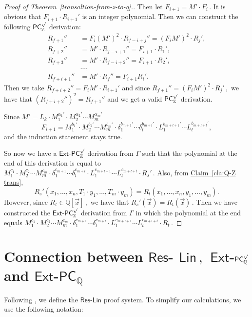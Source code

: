 \documentclass[11pt]{article}
\newcommand{\expref}[2]{\texorpdfstring{\hyperref[#2]{#1~\ref{#2}}}{#1~\ref{#2}}}
\newcommand{\Q}{{\mathbb Q}}
\newcommand{\Z}{{\mathbb Z}}
\begin{document}
\begin{proof}[Proof of \expref{Theorem}{transaltion-from-z-to-q}.]
%
Then let %
$F_{i + 1} = M' \cdot F_i\,.$ %
 It is obvious that $F_{i + 1} \cdot R_{i + 1}'$ is an integer polynomial. Then we can construct the following $\mathsf{PC}_{\Z}^{\surd}$ derivation: %
\begin{align*}
    R_{f + 1}'' &= F_i (M')^2 \cdot R_{f - i + j}'' =  (F_i M')^2 \cdot R_j', \\  R_{f + 2}'' &= M' \cdot R_{f - i + 1}'' = F_{i + 1} \cdot R_1', \\  R_{f + 3}'' &= M' \cdot R_{f - i + 2}'' = F_{i + 1} \cdot R_2', \\ &\ldots, \\ R_{f + i + 1}'' &= M' \cdot R_{f}'' = F_{i + 1} R_{i}'.
\end{align*}
Then we take $R_{f + i + 2}'' = F_i M' \cdot R_{i + 1}'$ and since %
$R_{f + 1}'' = (F_i M')^2 \cdot R_j'\,,$ %
 we have that $(R_{f + i + 2}'')^2 = R_{f + 1}''$ and we get a valid $\mathsf{PC}_{\Z}^{\surd}$ derivation.

%
Since  $M' = L_k \cdot M_1^{\alpha_1'} \cdot M_2^{\alpha_2'} \cdots M_m^{\alpha_m'}$ %
$$
%
F_{i + 1} = M_1^{b_1'} \cdot M_2^{b_2'} \cdots M_m^{b_m'} \cdot \delta_1^{b_{m + 1}'} \cdots \delta_l^{b_{m + l}'} \cdot  L_1^{b_{m + l + 1}'} \cdots L_t^{b_{m + l + t}'}, %
$$
and the induction statement stays true.




So now we have a $\mathsf{Ext}$-$\mathsf{PC}^{\surd}_{\Z}$ derivation from $\Gamma$ such that the polynomial at %
the end of this derivation is equal to %
$M_1^{c_1} \cdot M_2^{c_2} \cdots M_m^{c_m} \cdot \delta_1^{c_{m + 1}} \cdots \delta_l^{c_{m + l}} \cdot  L_1^{c_{m + l + 1}} \cdots L_t^{c_{m + l + t}}  \cdot R_s'\,.$ %
 Also, from  \expref{Claim}{cla:Q-Z trans},
$$
    R_s'(x_1, \ldots, x_n, T_1 \cdot y_1, \ldots, T_m \cdot y_m) = R_t(x_1, \ldots, x_n, y_1, \ldots, y_m).
$$
    However, since %
$R_t \in \Q[\vec x]\,,$ %
 we have that %
$R_s'(\vec x) = R_t(\vec x)\,.$ %
 Then we have constructed the $\mathsf{Ext}$-$\mathsf{PC}^{\surd}_{\Z}$ derivation from $\Gamma$ in which the polynomial at %
%
the end equals  %
$M_1^{c_1} \cdot M_2^{c_2} \cdots M_m^{c_m} \cdot \delta_1^{c_{m + 1}} \cdots \delta_l^{c_{m + l}} \cdot  L_1^{c_{m + l + 1}} \cdots L_t^{c_{m + l + t}}  \cdot R_t\,.$ %
%
\end{proof}


\section{Connection between \texorpdfstring{$\mathsf{Res}$-%
$\mathsf{Lin}\,,$ %
 $\mathsf{Ext}$-$\mathsf{PC}_{\Q}^{\surd}$ and $\mathsf{Ext}$-$\mathsf{PC}_{\Q}$}{Res-Lin, Ext-PC-Q-sqrt and Ext-PC-Q}}
\label{section-4}
Following \cite{RT07}, we define the $\mathsf{Res}$-$\mathsf{Lin}$ proof system. To simplify our calculations, we use the following notation:
\end{document}
